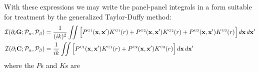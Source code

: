 \documentclass[letterpaper]{article}
\begin{document}
With these expressions we may write the panel-panel
integrals in a form suitable for treatment by the generalized 
Taylor-Duffy method:
\begin{align*}
 \mathcal{I}(\partial_i \mathbf{G};  \mathcal{P}_\alpha, \mathcal{P}_\beta)
&=\frac{1}{(ik)^2}
\iint \Big[  P^{\hbox{\tiny{G1}}}(\mathbf{x}, \mathbf{x}^\prime) K^{\hbox{\tiny{G1}}}(r)
             + P^{\hbox{\tiny{G2}}}(\mathbf{x}, \mathbf{x}^\prime) K^{\hbox{\tiny{G2}}}(r)
             + P^{\hbox{\tiny{G3}}}(\mathbf{x}, \mathbf{x}^\prime) K^{\hbox{\tiny{G3}}}(r)
        \Big]\,d\mathbf{x}\,d\mathbf{x}^\prime
\\
 \mathcal{I}(\partial_i \mathbf{C}; \mathcal{P}_\alpha, \mathcal{P}_\beta)
&=\frac{1}{ik}
  \iint \Big[  P^{\hbox{\tiny{C1}}}(\mathbf{x}, \mathbf{x}^\prime) K^{\hbox{\tiny{C1}}}(r)
              +P^{\hbox{\tiny{C2}}}(\mathbf{x}, \mathbf{x}^\prime) K^{\hbox{\tiny{C2}}}(r)
        \Big]\,d\mathbf{x} \, d\mathbf{x}^\prime
\end{align*}
where the $P$s and $K$s are
\end{document}
